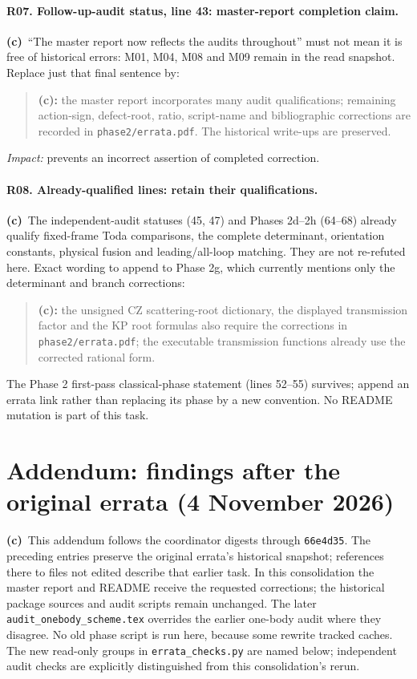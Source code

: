 \documentclass[11pt,a4paper]{article}
\newcommand{\C}{\textbf{(c)}\ }
\newcommand{\file}[1]{\nolinkurl{#1}}
\begin{document}
\paragraph{R07. Follow-up-audit status, line 43: master-report completion claim.}
\C ``The master report now reflects the audits throughout'' must not mean
it is free of historical errors: M01, M04, M08 and M09 remain in the read
snapshot. Replace just that final sentence by:
\begin{quote}
\textbf{(c):} the master report incorporates many audit qualifications;
remaining action-sign, defect-root, ratio, script-name and bibliographic
corrections are recorded in \file{phase2/errata.pdf}. The historical
write-ups are preserved.
\end{quote}
\textit{Impact:} prevents an incorrect assertion of completed correction.

\paragraph{R08. Already-qualified lines: retain their qualifications.}
\C The independent-audit statuses (45, 47) and Phases 2d--2h (64--68)
already qualify fixed-frame Toda comparisons, the complete determinant,
orientation constants, physical fusion and leading/all-loop matching.
They are not re-refuted here. Exact wording to append to Phase 2g, which
currently mentions only the determinant and branch corrections:
\begin{quote}
\textbf{(c):} the unsigned CZ scattering-root dictionary, the displayed
transmission factor and the KP root formulas also require the corrections
in \file{phase2/errata.pdf}; the executable transmission functions already
use the corrected rational form.
\end{quote}
The Phase 2 first-pass classical-phase statement (lines 52--55) survives;
append an errata link rather than replacing its phase by a new convention.
No README mutation is part of this task.

\section{Addendum: findings after the original errata (4 November 2026)}
\C This addendum follows the coordinator digests through \file{66e4d35}.
The preceding entries preserve the original errata's historical snapshot;
references there to files not edited describe that earlier task. In this
consolidation the master report and README receive the requested corrections;
the historical package sources and audit scripts remain unchanged. The later
\file{audit_onebody_scheme.tex} overrides the earlier one-body audit where they
disagree. No old phase script is run here, because some rewrite tracked caches.
The new read-only groups in \file{errata_checks.py} are named below; independent
audit checks are explicitly distinguished from this consolidation's rerun.
\end{document}
